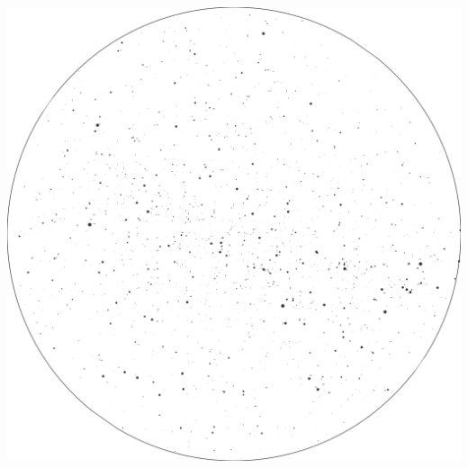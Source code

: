 \documentclass{./SAS-class-skygen}
\begin{document}
	\vspace{0.5cm}
    \begin{center}
    \includegraphics[width=\textwidth]{./pics/skychart28.png}
    \end{center}
    
    
\end{document}
